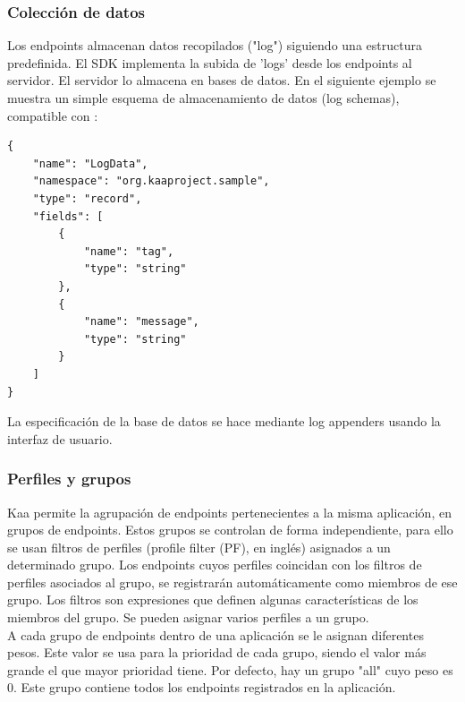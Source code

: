 \documentclass[12pt, twoside]{book}
\newcommand{\MYhref}[3][blue]{\href{#2}{\color{#1}{#3}}}
\begin{document}
\subsubsection*{Colección de datos}
Los endpoints almacenan datos recopilados ("log") siguiendo una estructura predefinida. El SDK implementa la subida de 'logs' desde los endpoints al servidor. El servidor lo almacena en bases de datos. En el siguiente ejemplo se muestra un simple esquema de almacenamiento de datos (log schemas), compatible con \MYhref{http://avro.apache.org/docs/current/spec.html}{Avro Schema}:
\begin{lstlisting}
{
    "name": "LogData",
    "namespace": "org.kaaproject.sample",
    "type": "record",
    "fields": [
    	{
            "name": "tag",
            "type": "string"
        },
        {
            "name": "message",
            "type": "string"
        }
    ]
}
\end{lstlisting}
La especificación de la base de datos se hace mediante log appenders usando la interfaz de usuario. 
\subsubsection*{Perfiles y grupos}\label{sec:grouping}
Kaa permite la agrupación de endpoints pertenecientes a la misma aplicación, en grupos de endpoints. Estos grupos se controlan de forma independiente, para ello se usan filtros de perfiles (profile filter (PF), en inglés) asignados a un determinado grupo. Los endpoints cuyos perfiles coincidan con los filtros de perfiles asociados al grupo, se registrarán automáticamente como miembros de ese grupo. Los filtros son expresiones que definen algunas características de los miembros del grupo. Se pueden asignar varios perfiles a un grupo.\\
A cada grupo de endpoints dentro de una aplicación se le asignan diferentes pesos. Este valor se usa para la prioridad de cada grupo, siendo el valor más grande el que mayor prioridad tiene. Por defecto, hay un grupo "all" cuyo peso es 0. Este grupo contiene todos los endpoints registrados en la aplicación.  \\
\end{document}
